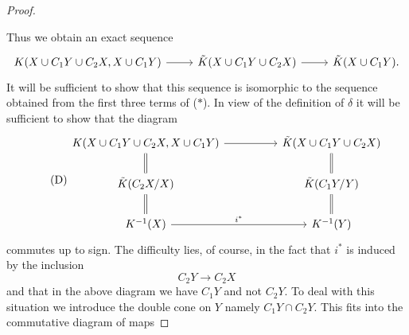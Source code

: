 \documentclass[leqno]{book}
\numberwithin{equation}{section}
\theoremstyle{definition}
\begin{document}
\begin{proof}
\begin{figure}[htbp]
              \end{figure}
              Thus we obtain an exact sequence
              \begin{equation*}
                \begin{tikzcd}
                  K(X\cup C_1 Y\cup C_2 X, X\cup C_1 Y)\arrow[r] & \tilde{K}(X\cup C_1 Y\cup C_2 X)\arrow[r] & \tilde{K}(X\cup C_1 Y).
                \end{tikzcd}
              \end{equation*}
              It will be sufficient to show that this sequence is isomorphic to the sequence obtained from the first three terms of ($*$). In view of the definition of $\delta$ it will be sufficient to show that the diagram
              \begin{equation*}
                \tag{D}
                \begin{tikzcd}
                  {K(X\cup C_1 Y\cup C_2 X, X\cup C_1 Y)} \arrow[rr] \arrow[d, equal] &  & \tilde{K}(X\cup C_1 Y \cup C_2 X) \arrow[d, equal] \\
                  \tilde{K}(C_2 X/X) \arrow[d, equal]                                 &  & \tilde{K}(C_1 Y/Y) \arrow[d, equal]                \\
                  K^{-1}(X) \arrow[rr, "i^{*}"]                                                     &  & K^{-1}(Y)                                                       
                \end{tikzcd}
              \end{equation*}
              commutes up to sign. The difficulty lies, of course, in the fact that $i^{*}$ is induced by the inclusion
              \begin{equation*}
                C_2 Y\to C_2 X
              \end{equation*}
              and that in the above diagram we have $C_1 Y$ and not $C_2 Y$. To deal with this situation we introduce the double cone on $Y$ namely $C_1 Y \cap C_2 Y$. This fits into the commutative diagram of maps

\end{proof}
\end{document}
